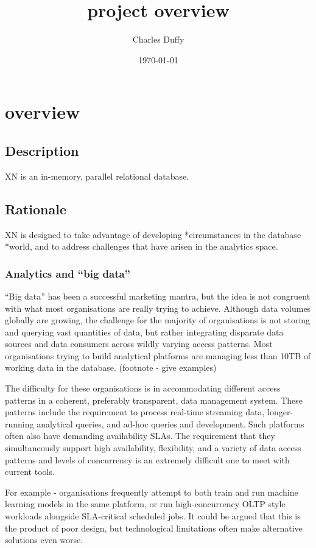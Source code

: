 \documentclass[12pt]{article}
\title{project overview}
\author{Charles Duffy}
\date{\today}
\begin{document}
\maketitle
\section{overview} %
\subsection{Description}
XN is an in-memory, parallel relational database. 
\subsection{Rationale}
XN is designed to take advantage of developing *circumstances in the database *world, and
to address challenges that have arisen in the analytics space.
\subsubsection{Analytics and “big data”}

“Big data” has been a successful marketing mantra, but the idea is not congruent 
with what most organisations are really trying to achieve. Although data volumes globally are growing, the challenge
for the majority of organisations is not storing and querying vast quantities of data, 
but rather integrating disparate data sources and data consumers across wildly varying access patterns. 
Most organisations trying to build analytical platforms are managing less than 10TB of working data in the database. (footnote - give examples)

The difficulty for these organisations is in accommodating different access patterns in a coherent, preferably
transparent, data management system. These patterns include the requirement to process real-time streaming data, 
longer-running analytical queries, and ad-hoc queries and development. 
Such platforms often also have demanding availability SLAs. The requirement that they simultaneously support high availability, 
flexibility, and a variety of data access patterns and levels of concurrency is an extremely difficult one to meet with current tools. 

For example - organisations frequently attempt to both train and run machine learning models in the same platform, or run
high-concurrency OLTP style workloads alongside SLA-critical scheduled jobs. It could be argued that this is the product of
poor design, but technological limitations often make alternative solutions even worse.
\end{document}

